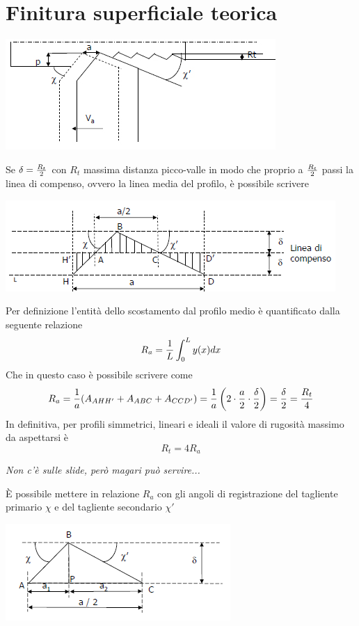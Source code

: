 \documentclass[a4paper, 15pt]{article}
\begin{document}
	\section{Finitura superficiale teorica}
\begin{center}
	\includegraphics[width=0.5\linewidth]{figures/asp14}
\end{center}	
	Se $\delta={R_t\over2}$ con $R_t$ massima distanza picco-valle in modo che proprio a ${R_t\over2}$ passi la linea di compenso, ovvero la linea media del profilo, è possibile scrivere
\begin{center}
	\includegraphics[width=0.7\linewidth]{figures/asp15}
\end{center}
	Per definizione l'entità dello scostamento dal profilo medio è quantificato dalla seguente relazione
	\[R_a = {1\over L}\int_{0}^{L}y(x)dx\]
	Che in questo caso è possibile scrivere come 
	\[R_a = {1\over a} (A_{AHH'} + A_{ABC} + A_{CCD'}) = {1\over a}\left(2\cdot{a\over2}\cdot{\delta\over2}\right) = {\delta\over2} = {R_t\over4}\]
	In definitiva, per profili simmetrici, lineari e ideali il valore di rugosità massimo da aspettarsi è
	\begin{equation}\label{eq:22}
		\boxed{R_t=4R_a}
	\end{equation} 
	\newpage
	\begin{center}
		{\small\textit{Non c'è sulle slide, però magari può servire...}}
	\end{center}
	È possibile mettere in relazione $R_a$ con gli angoli di registrazione del tagliente primario $\chi$ e del tagliente secondario $\chi'$
\begin{center}
	\includegraphics[width=0.7\linewidth]{figures/asp16}
\end{center}
\end{document}
